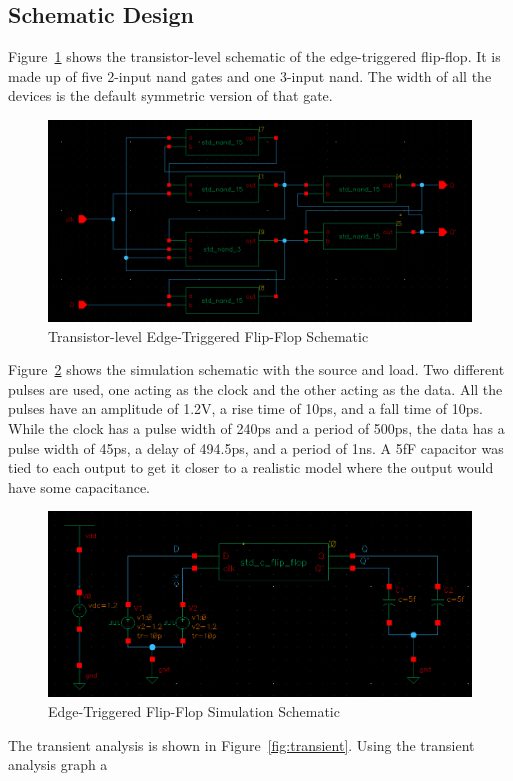 \documentclass[12pt]{article}
\begin{document}
\subsection{Schematic Design}
Figure~\ref{fig:schem} shows the transistor-level schematic of the edge-triggered flip-flop.
It is made up of five 2-input nand gates and one 3-input nand. The width of all the devices is the
default symmetric version of that gate.
\begin{figure}[!htb]
  \centering
  \includegraphics[width=5in]{figures/schem.png}
  \caption{Transistor-level Edge-Triggered Flip-Flop Schematic}\label{fig:schem}
\end{figure}
Figure~\ref{fig:sim} shows the simulation schematic with the source and load. 
Two different pulses are used, one acting as the clock and the other acting as the data.
All the pulses have an amplitude of 1.2V, a rise time of 10ps, and a fall time of 10ps.
While the clock has a pulse width of 240ps and a period of 500ps, the data has a pulse width of 45ps,
a delay of 494.5ps, and a period of 1ns.
A 5fF capacitor was tied to each output to get it closer to a realistic model where the output would have some capacitance.
\begin{figure}[!htb]
  \centering
  \includegraphics[width=5in]{figures/sim.png}
  \caption{Edge-Triggered Flip-Flop Simulation Schematic}\label{fig:sim}
\end{figure}
The transient analysis is shown in Figure~\ref{fig:transient}. Using the transient analysis graph a
\end{document}
